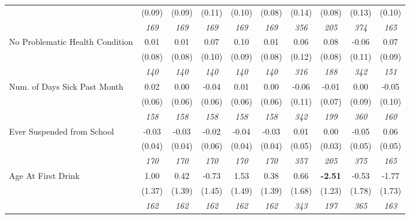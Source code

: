 \begin{tabular}{l c c c c c c c c c}
& (0.09) & (0.09) & (0.11) & (0.10) & (0.08) & (0.14) & (0.08) & (0.13) & (0.10) \\
& \textit{ 169 } & \textit{ 169 } & \textit{ 169 } & \textit{ 169 } & \textit{ 169 } & \textit{ 356 } & \textit{ 205 } & \textit{ 374 } & \textit{ 165 } \\
No Problematic Health Condition & 0.01 & 0.01 & 0.07 & 0.10 & 0.01 & 0.06 & 0.08 & -0.06 & 0.07 \\
& (0.08) & (0.08) & (0.10) & (0.09) & (0.08) & (0.12) & (0.08) & (0.11) & (0.09) \\
& \textit{ 140 } & \textit{ 140 } & \textit{ 140 } & \textit{ 140 } & \textit{ 140 } & \textit{ 316 } & \textit{ 188 } & \textit{ 342 } & \textit{ 151 } \\
Num. of Days Sick Past Month & 0.02 & 0.00 & -0.04 & 0.01 & 0.00 & -0.06 & -0.01 & 0.00 & -0.05 \\
& (0.06) & (0.06) & (0.06) & (0.06) & (0.06) & (0.11) & (0.07) & (0.09) & (0.10) \\
& \textit{ 158 } & \textit{ 158 } & \textit{ 158 } & \textit{ 158 } & \textit{ 158 } & \textit{ 342 } & \textit{ 199 } & \textit{ 360 } & \textit{ 160 } \\
Ever Suspended from School & -0.03 & -0.03 & -0.02 & -0.04 & -0.03 & 0.01 & 0.00 & -0.05 & 0.06 \\
& (0.04) & (0.04) & (0.06) & (0.04) & (0.04) & (0.05) & (0.03) & (0.05) & (0.05) \\
& \textit{ 170 } & \textit{ 170 } & \textit{ 170 } & \textit{ 170 } & \textit{ 170 } & \textit{ 357 } & \textit{ 205 } & \textit{ 375 } & \textit{ 165 } \\
Age At First Drink & 1.00 & 0.42 & -0.73 & 1.53 & 0.38 & 0.66 & \textbf{-2.51} & -0.53 & -1.77 \\
& (1.37) & (1.39) & (1.45) & (1.49) & (1.39) & (1.68) & (1.23) & (1.78) & (1.73) \\
& \textit{ 162 } & \textit{ 162 } & \textit{ 162 } & \textit{ 162 } & \textit{ 162 } & \textit{ 343 } & \textit{ 197 } & \textit{ 365 } & \textit{ 163 } \\
\bottomrule
\end{tabular}

